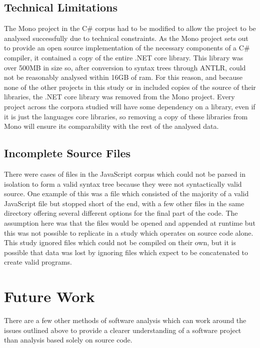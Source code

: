 \subsection{Technical Limitations}
The Mono project in the C\# corpus had to be modified to allow the project to be analysed successfully due to technical constraints. As the Mono project sets out to provide an open source implementation of the necessary components of a C\# compiler, it contained a copy of the entire .NET core library. This library was over 500MB in size so, after conversion to syntax trees through ANTLR, could not be reasonably analysed within 16GB of ram. For this reason, and because none of the other projects in this study or in \cite{QualitasCorpus} included copies of the source of their libraries, the .NET core library was removed from the Mono project. Every project across the corpora studied will have some dependency on a library, even if it is just the languages core libraries, so removing a copy of these libraries from Mono will ensure its comparability with the rest of the analysed data.

\subsection{Incomplete Source Files}
There were cases of files in the JavaScript corpus which could not be parsed in isolation to form a valid syntax tree because they were not syntactically valid source. One example of this was a file which consisted of the majority of a valid JavaScript file but stopped short of the end, with a few other files in the same directory offering several different options for the final part of the code. The assumption here was that the files would be opened and appended at runtime but this was not possible to replicate in a study which operates on source code alone. This study ignored files which could not be compiled on their own, but it is possible that data was lost by ignoring files which expect to be concatenated to create valid programs.

\section{Future Work}
There are a few other methods of software analysis which can work around the issues outlined above to provide a clearer understanding of a software project than analysis based solely on source code.

